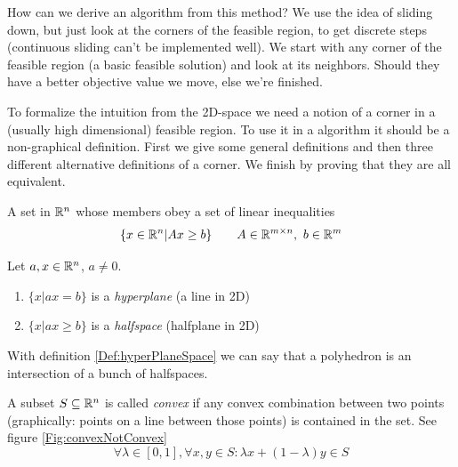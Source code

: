 How can we derive an algorithm from this method? We use the idea of sliding down, but just look at the corners of the feasible region, to get discrete steps (continuous sliding can't be implemented well). We start with any corner of the feasible region (a basic feasible solution) and look at its neighbors. Should they have a better objective value we move, else we're finished. 

To formalize the intuition from the 2D-space we need a notion of a corner in a (usually high dimensional) feasible region. To use it in a algorithm it should be a non-graphical definition. First we give some general definitions and then three different alternative definitions of a corner. We finish by proving that they are all equivalent.

\begin{Def}[Polyhedron]\label{Def:polyhedron} A set in $\mathbb{R}^n$ whose members obey a set of linear inequalities
\[\{x\in \mathbb{R}^n | Ax \geq b\} \qquad A\in \mathbb{R}^{m\times n},\ b\in \mathbb{R}^m\]
\end{Def}

\begin{Def} \label{Def:hyperPlaneSpace} Let $a,x\in \mathbb{R}^n$, $a\neq 0$. 
\begin{enumerate}
\item $\{x|ax=b\}$ is a \emph{hyperplane} (a line in 2D)
\item $\{x|ax\geq b\}$ is a \emph{halfspace} (halfplane in 2D)
\end{enumerate}
\end{Def}

With definition \ref{Def:hyperPlaneSpace} we can say that a polyhedron is an intersection of a bunch of halfspaces.

\begin{Def} A subset $S \subseteq \mathbb{R}^n$ is called \emph{convex} if any convex combination between two points (graphically: points on a line between those points) is contained in the set. See figure \ref{Fig:convexNotConvex}
\[\forall \lambda \in [0,1], \forall x,y\in S: \lambda x + (1-\lambda) y \in S\]
\end{Def}

